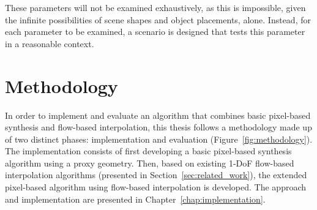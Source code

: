 These parameters will not be examined exhaustively, as this is impossible, given the infinite possibilities of scene shapes and object placements, alone. Instead, for each parameter to be examined, a scenario is designed that tests this parameter in a reasonable context.


%
%
%
%

\section*{Methodology}
In order to implement and evaluate an algorithm that combines basic pixel-based synthesis and flow-based interpolation, this thesis follows a methodology made up of two distinct phases: implementation and evaluation (Figure~\ref{fig:methodology}). The implementation consists of first developing a basic pixel-based synthesis algorithm using a proxy geometry. Then, based on existing 1-DoF flow-based interpolation algorithms (presented in Section~\ref{sec:related_work}), the extended pixel-based algorithm using flow-based interpolation is developed. The approach and implementation are presented in Chapter~\ref{chap:implementation}.

